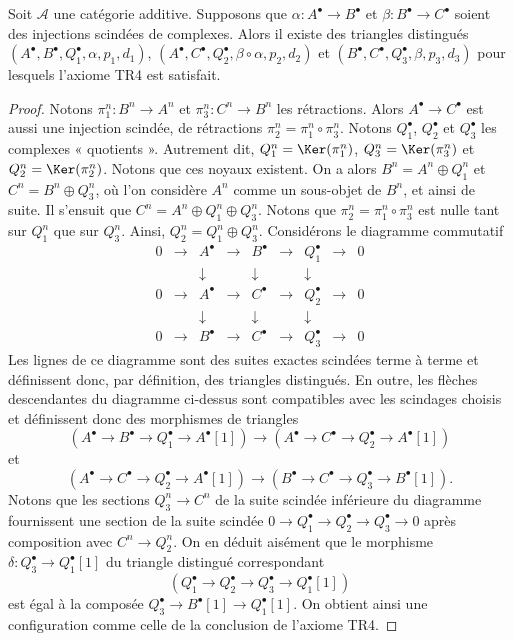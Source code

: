 \begin{lemma}
\label{lemma-two-split-injections}
Soit $\mathcal{A}$ une catégorie additive. Supposons que
$\alpha : A^\bullet \to B^\bullet$ et $\beta : B^\bullet \to C^\bullet$
soient des injections scindées de complexes. Alors il existe des triangles
distingués
$(A^\bullet, B^\bullet, Q_1^\bullet, \alpha, p_1, d_1)$,
$(A^\bullet, C^\bullet, Q_2^\bullet, \beta \circ \alpha, p_2, d_2)$ et
$(B^\bullet, C^\bullet, Q_3^\bullet, \beta, p_3, d_3)$
pour lesquels l'axiome TR4 est satisfait.
\end{lemma}

\begin{proof}
Notons $\pi_1^n : B^n \to A^n$ et $\pi_3^n : C^n \to B^n$ les rétractions.
Alors $A^\bullet \to C^\bullet$ est aussi une injection scindée, de
rétractions $\pi_2^n = \pi_1^n \circ \pi_3^n$. Notons $Q_1^\bullet$,
$Q_2^\bullet$ et $Q_3^\bullet$ les complexes « quotients ». Autrement dit,
$Q_1^n = \Ker(\pi_1^n)$, $Q_3^n = \Ker(\pi_3^n)$ et
$Q_2^n = \Ker(\pi_2^n)$. Notons que ces noyaux existent. On a alors
$B^n = A^n \oplus Q_1^n$ et $C^n = B^n \oplus Q_3^n$, où l'on considère
$A^n$ comme un sous-objet de $B^n$, et ainsi de suite. Il s'ensuit que
$C^n = A^n \oplus Q_1^n \oplus Q_3^n$. Notons que
$\pi_2^n = \pi_1^n \circ \pi_3^n$ est nulle tant sur $Q_1^n$ que sur $Q_3^n$.
Ainsi, $Q_2^n = Q_1^n \oplus Q_3^n$. Considérons le diagramme commutatif
$$
\begin{matrix}
0 & \to & A^\bullet & \to & B^\bullet & \to & Q_1^\bullet & \to & 0 \\
  &     & \downarrow &     & \downarrow &     & \downarrow  & \\
0 & \to & A^\bullet & \to & C^\bullet & \to & Q_2^\bullet & \to & 0 \\
  &     & \downarrow &     & \downarrow &     & \downarrow  & \\
0 & \to & B^\bullet & \to & C^\bullet & \to & Q_3^\bullet & \to & 0
\end{matrix}
$$
Les lignes de ce diagramme sont des suites exactes scindées terme à terme et
définissent donc, par définition, des triangles distingués. En outre, les
flèches descendantes du diagramme ci-dessus sont compatibles avec les
scindages choisis et définissent donc des morphismes de triangles
$$
(A^\bullet \to B^\bullet \to Q_1^\bullet \to A^\bullet[1])
\longrightarrow
(A^\bullet \to C^\bullet \to Q_2^\bullet \to A^\bullet[1])
$$
et
$$
(A^\bullet \to C^\bullet \to Q_2^\bullet \to A^\bullet[1])
\longrightarrow
(B^\bullet \to C^\bullet \to Q_3^\bullet \to B^\bullet[1]).
$$
Notons que les sections $Q_3^n \to C^n$ de la suite scindée inférieure du
diagramme fournissent une section de la suite scindée
$0 \to Q_1^\bullet \to Q_2^\bullet \to Q_3^\bullet \to 0$ après composition
avec $C^n \to Q_2^n$. On en déduit aisément que le morphisme
$\delta : Q_3^\bullet \to Q_1^\bullet[1]$ du triangle distingué correspondant
$$
(Q_1^\bullet \to Q_2^\bullet \to Q_3^\bullet \to Q_1^\bullet[1])
$$
est égal à la composée $Q_3^\bullet \to B^\bullet[1] \to Q_1^\bullet[1]$.
On obtient ainsi une configuration comme celle de la conclusion de l'axiome
TR4.
\end{proof}


